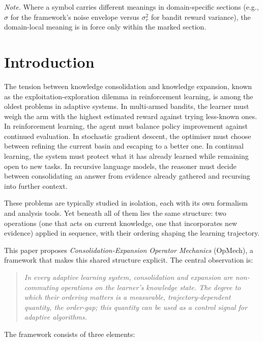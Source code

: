 \documentclass[12pt,a4paper]{article}
\begin{document}
\medskip
\noindent\emph{Note.} Where a symbol carries different meanings in
domain-specific sections (e.g., $\sigma$ for the framework's noise
envelope versus $\sigma_r^2$ for bandit reward variance), the
domain-local meaning is in force only within the marked section.

\section{Introduction}
\label{sec:intro}

The tension between knowledge consolidation and knowledge expansion, known as
the exploitation-exploration dilemma in reinforcement learning, is among
the oldest problems in adaptive systems. In multi-armed bandits, the learner
must weigh the arm with the highest estimated reward against trying less-known
ones. In reinforcement learning, the agent must balance policy improvement
against continued evaluation. In stochastic gradient descent, the optimiser
must choose between refining the current basin and escaping to a better one.
In continual learning, the system must protect what it has already learned
while remaining open to new tasks. In recursive language models, the reasoner
must decide between consolidating an answer from evidence already gathered
and recursing into further context.

These problems are typically studied in isolation, each with its own
formalism and analysis tools. Yet beneath all of them lies the same structure:
two operations (one that acts on current knowledge, one that incorporates
new evidence) applied in sequence, with their ordering shaping the learning
trajectory.

This paper proposes \emph{Consolidation-Expansion Operator Mechanics} (OpMech),
a framework that makes this shared structure explicit. The central
observation is:

\begin{quote}
\emph{In every adaptive learning system, consolidation and expansion are
non-commuting operations on the learner's knowledge state. The degree to which
their ordering matters is a measurable, trajectory-dependent quantity, the
order-gap; this quantity can be used as a control signal for adaptive
algorithms.}
\end{quote}

The framework consists of three elements:
\end{document}
